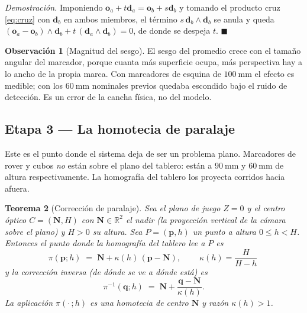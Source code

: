 \documentclass[11pt,a4paper]{article}
\newtheorem{teorema}{Teorema}[section]
\theoremstyle{definition}
\newtheorem{observacion}[teorema]{Observación}
\newenvironment{demo}{\par\noindent\textit{Demostración.}\;}{\hfill$\blacksquare$\par\medskip}
\newcommand{\R}{\mathbb{R}}
\newcommand{\dd}{\mathbf{d}}
\newcommand{\pp}{\mathbf{p}}
\newcommand{\qq}{\mathbf{q}}
\newcommand{\NN}{\mathbf{N}}
\begin{document}
\begin{demo}
Imponiendo $\mathbf o_a + t\dd_a = \mathbf o_b + s\dd_b$ y tomando el producto cruz
\eqref{eq:cruz} con $\dd_b$ en ambos miembros, el término $s\,\dd_b\wedge\dd_b$ se
anula y queda $(\mathbf o_a - \mathbf o_b)\wedge\dd_b + t\,(\dd_a\wedge\dd_b) = 0$,
de donde se despeja $t$.
\end{demo}

\begin{observacion}[Magnitud del sesgo]
El sesgo del promedio crece con el tamaño angular del marcador, porque cuanta más
superficie ocupa, más perspectiva hay a lo ancho de la propia marca. Con marcadores de
esquina de $100\ \mathrm{mm}$ el efecto es medible; con los $60\ \mathrm{mm}$ nominales
previos quedaba escondido bajo el ruido de detección. Es un error de la cancha física,
no del modelo.
\end{observacion}

\subsection{Etapa 3 --- La homotecia de paralaje}
\label{sec:paralaje}

Este es el punto donde el sistema deja de ser un problema plano. Marcadores de rover y
cubos \emph{no} están sobre el plano del tablero: están a $90\ \mathrm{mm}$ y
$60\ \mathrm{mm}$ de altura respectivamente. La homografía del tablero los proyecta
corridos hacia afuera.

\begin{teorema}[Corrección de paralaje]
\label{teo:paralaje}
Sea el plano de juego $Z=0$ y el centro óptico $C = (\NN, H)$ con $\NN\in\R^2$ el
\emph{nadir} (la proyección vertical de la cámara sobre el plano) y $H>0$ su altura.
Sea $P = (\pp, h)$ un punto a altura $0 \le h < H$. Entonces el punto donde la
homografía del tablero \emph{lee} a $P$ es
\begin{equation}
  \pi(\pp;h) \;=\; \NN + \kappa(h)\,(\pp - \NN),
  \qquad
  \boxed{\ \kappa(h) = \frac{H}{H-h}\ }
  \label{eq:paralaje}
\end{equation}
y la corrección inversa (de dónde se ve a dónde está) es
\begin{equation}
  \pi^{-1}(\qq;h) \;=\; \NN + \frac{\qq - \NN}{\kappa(h)} .
  \label{eq:paralaje-inv}
\end{equation}
La aplicación $\pi(\cdot\,;h)$ es una homotecia de centro $\NN$ y razón $\kappa(h)>1$.
\end{teorema}
\end{document}
